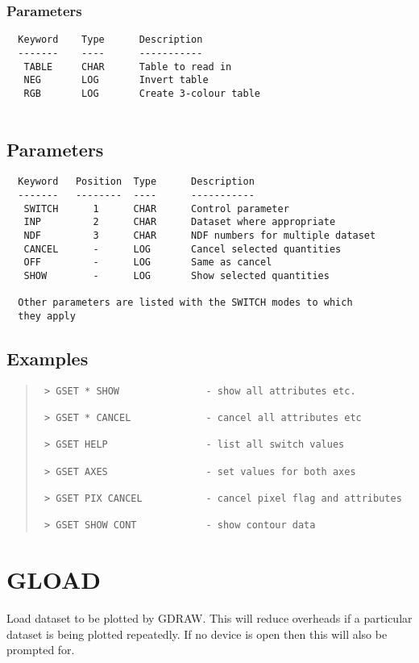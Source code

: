\documentclass{book}
\renewcommand{\_}{{\tt\char'137}}     %
\begin{document}
\subsubsection{Parameters}
\begin{verbatim}
  Keyword    Type      Description
  -------    ----      -----------
   TABLE     CHAR      Table to read in
   NEG       LOG       Invert table
   RGB       LOG       Create 3-colour table
 
\end{verbatim}\subsection{Parameters}
\begin{verbatim}
  Keyword   Position  Type      Description
  -------   --------  ----      -----------
   SWITCH      1      CHAR      Control parameter
   INP         2      CHAR      Dataset where appropriate
   NDF         3      CHAR      NDF numbers for multiple dataset
   CANCEL      -      LOG       Cancel selected quantities
   OFF         -      LOG       Same as cancel
   SHOW        -      LOG       Show selected quantities
 
  Other parameters are listed with the SWITCH modes to which
  they apply
\end{verbatim}\subsection{Examples}
\begin{quote}\begin{verbatim}
 > GSET * SHOW               - show all attributes etc.
 
 > GSET * CANCEL             - cancel all attributes etc
 
 > GSET HELP                 - list all switch values
 
 > GSET AXES                 - set values for both axes
 
 > GSET PIX CANCEL           - cancel pixel flag and attributes
 
 > GSET SHOW CONT            - show contour data
\end{verbatim}\end{quote}
\section{GLOAD}
Load dataset to be plotted by GDRAW. This will reduce overheads
if a particular dataset is being plotted repeatedly. If no device
is open then this will also be prompted for.
 
\end{document}
